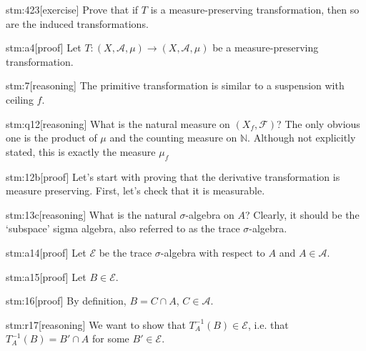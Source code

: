 \documentclass{article}
\begin{document}

\begin{stm}{stm:423}[exercise]
Prove that if $T$ is a measure-preserving transformation, then so are the induced transformations.
\end{stm}


\begin{stm}{stm:a4}[proof]
Let $T : (X, \mathcal{A}, \mu) \to (X, \mathcal{A}, \mu)$ be a measure-preserving transformation.
\end{stm}

\begin{stm}{stm:7}[reasoning]
The primitive transformation is similar to a suspension with ceiling $f$.
\end{stm}

\begin{stm}{stm:q12}[reasoning]
What is the natural measure on $(X_f, \mathcal{F})$? The only obvious one is the product of $\mu$ and the counting measure on $\mathbb{N}$. Although not explicitly stated, this is exactly the measure $\mu_f$
\end{stm}

\begin{stm}{stm:12b}[proof]
Let's start with proving that the derivative transformation is measure preserving. First, let's check that it is measurable. 
\end{stm}

\begin{stm}{stm:13c}[reasoning]
What is the natural $\sigma$-algebra on $A$? Clearly, it should be the ‘subspace’ sigma algebra, also referred to as the trace $\sigma$-algebra.
\end{stm}

\begin{stm}{stm:a14}[proof]
Let $\mathcal{E}$ be the trace $\sigma$-algebra with respect to $A$ and $A \in \mathcal{A}$.
\end{stm}

\begin{stm}{stm:a15}[proof]
Let $B \in \mathcal{E}$.
\end{stm}

\begin{stm}{stm:16}[proof]
By definition, $B = C \cap A$, $C \in \mathcal{A}$.
\end{stm}

\begin{stm}{stm:r17}[reasoning]
We want to show that $T_A^{-1}(B) \in \mathcal{E}$, i.e. that $T_A^{-1}(B) = B' \cap A$ for some $B' \in \mathcal{E}$.
\end{stm}
\end{document}
